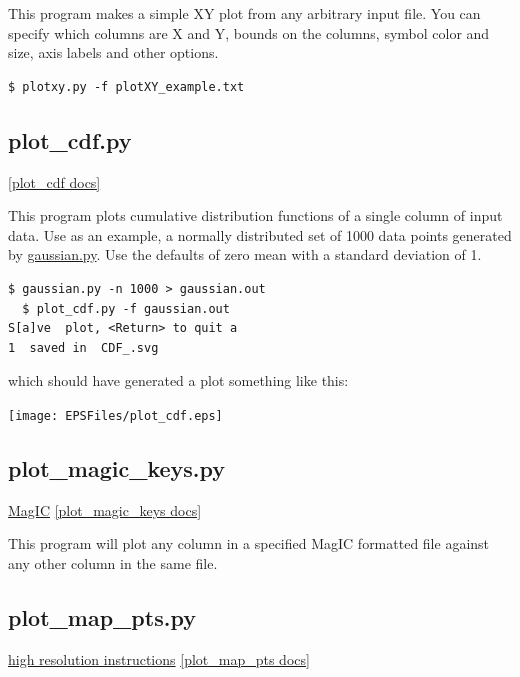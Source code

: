 \documentclass[11pt]{book}
\begin{document}
{{{{This program makes a simple XY plot from any arbitrary input file.  You can specify which columns are X and Y, bounds on the columns, symbol color and size, axis labels and other options.

\begin{verbatim}
$ plotxy.py -f plotXY_example.txt
\end{verbatim}


  \subsection{plot\_cdf.py}
  \href{https://github.com/PmagPy/PmagPy/blob/master/programs/plot_cdf.py}{[plot\_cdf docs]}

This program plots cumulative distribution functions of a single column of input data.  Use as an example, a normally distributed set of 1000 data points generated by \href{#gaussian.py}{gaussian.py}.  Use the defaults of zero mean with a standard deviation of 1.

\begin{verbatim}
$ gaussian.py -n 1000 > gaussian.out
  $ plot_cdf.py -f gaussian.out
S[a]ve  plot, <Return> to quit a
1  saved in  CDF_.svg
\end{verbatim}

which should have generated a plot something like this:


\texttt{[image: EPSFiles/plot\_cdf.eps]}


%



  \subsection{plot\_magic\_keys.py}
  \href{#MagIC}{MagIC}
  \href{https://github.com/PmagPy/PmagPy/blob/master/programs/plot_magic_keys.py}{[plot\_magic\_keys docs]}

  This program will plot any column in a specified MagIC formatted file against any other column in the same file.


  \subsection{plot\_map\_pts.py}
  \href{#hires}{high resolution instructions}
  \href{https://github.com/PmagPy/PmagPy/blob/master/programs/plot_map_pts.py}{[plot\_map\_pts docs]}

}}}}
\end{document}
